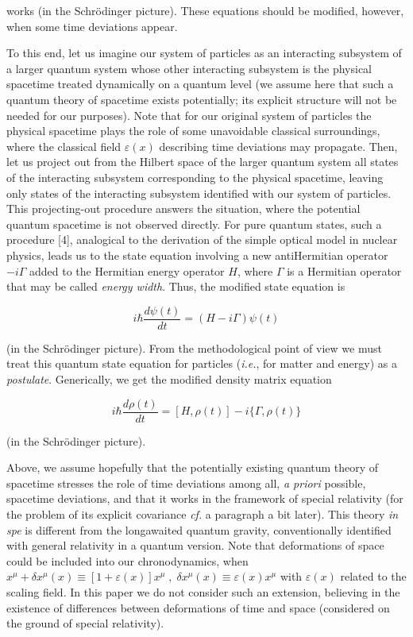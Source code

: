 \documentclass[a4paper,12pt]{article}
\begin{document}
\ni works (in the Schr\"{o}dinger picture). These equations should be modified, however, when some time deviations appear.

To this end, let us imagine our system of particles as an interacting subsystem of a larger quantum system whose other interacting subsystem is the physical spacetime treated dynamically on a quantum level (we assume here that such a quantum theory of spacetime exists potentially; its explicit structure will not be needed for our purposes). Note that for our original system of particles the physical spacetime plays the role of some unavoidable classical surroundings, where the classical field $\varepsilon(x)$ describing time deviations may propagate. Then, let us project out from the Hilbert space of the larger quantum system all states of the interacting subsystem  corresponding to the physical spacetime, leaving only states of the interacting subsystem identified with our system of particles. This projecting-out procedure answers the situation, where the potential quantum spacetime is not observed directly. For pure quantum states, such a procedure [4], analogical to the derivation of the simple optical model in nuclear physics, leads us to the state equation involving a new antiHermitian operator $-i\Gamma$ added to the Hermitian energy operator $H$, where $\Gamma$ is a Hermitian operator that may be called {\it energy width}. Thus, the modified state equation is

\begin{equation}
i \hbar \frac{d\psi (t)}{dt} = (H - i\Gamma)\psi (t)
\end{equation}

\ni (in the Schr\"{o}dinger picture). From the methodological point of view we must treat this quantum state equation for particles ({\it i.e.}, for matter and energy) as a {\it postulate}. Generically, we get the modified density matrix equation

\begin{equation}
i \hbar \frac{d\rho(t)}{dt} = [H,\rho(t)] - i\{\Gamma,\rho(t)\}
\end{equation}

\ni (in the Schr\"{o}dinger picture).

Above, we assume hopefully that the potentially existing quantum theory of spacetime stresses the role of time deviations among all, {\it a priori} possible, spacetime deviations, and that it works in the framework of special relativity (for the problem of its explicit covariance {\it cf.} a paragraph a bit later). This theory {\it in spe} is different from the long\-awaited quantum gravity, conventionally identified with general relativity in a quantum version. Note that deformations of space could be included into our chronodynamics, when $ x^\mu + \delta x^\mu(x) \equiv [1+\varepsilon(x)] x^\mu\;,\;\delta x^\mu(x) \equiv \varepsilon(x) x^\mu $ with $\varepsilon(x)$ related to the scaling field. In this paper we do not consider such an extension, believing in the existence of differences between deformations of time and space (considered on the ground of special relativity).
\end{document}
